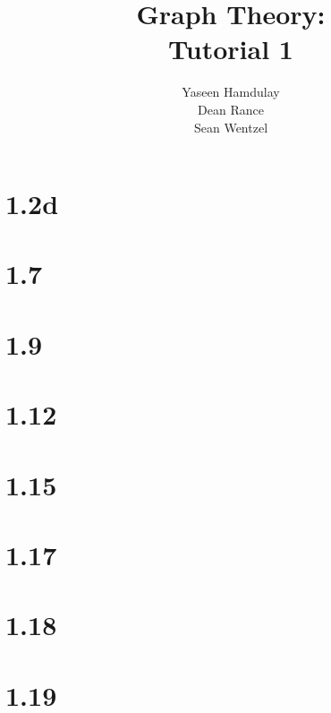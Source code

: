 \documentclass[12pt,a4paper]{article}
\title{{\bf Graph Theory:}\\
Tutorial 1}
\author{Yaseen Hamdulay \\
	Dean Rance \\
	Sean Wentzel}
\begin{document}
\maketitle
\section*{1.2d}

\section*{1.7}

\section*{1.9}

\section*{1.12}

\section*{1.15}

\section*{1.17}

\section*{1.18}

\section*{1.19}


\end{document}
